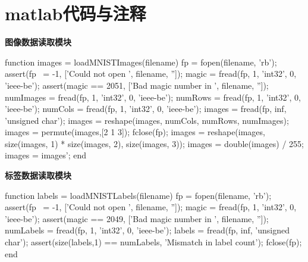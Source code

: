\newpage
\appendix
\section{matlab代码与注释}

\textcolor[rgb]{0.98,0.00,0.00}{\textbf{图像数据读取模块}}
\begin{python}
function images = loadMNISTImages(filename)
fp = fopen(filename, 'rb');
assert(fp ~= -1, ['Could not open ', filename, '']);
magic = fread(fp, 1, 'int32', 0, 'ieee-be');
assert(magic == 2051, ['Bad magic number in ', filename, '']);
numImages = fread(fp, 1, 'int32', 0, 'ieee-be');
numRows = fread(fp, 1, 'int32', 0, 'ieee-be');
numCols = fread(fp, 1, 'int32', 0, 'ieee-be');
images = fread(fp, inf, 'unsigned char');
images = reshape(images, numCols, numRows, numImages);
images = permute(images,[2 1 3]);
fclose(fp);
images = reshape(images, size(images, 1) * size(images, 2), size(images, 3));
images = double(images) / 255;
images = images';
end
\end{python}

\textcolor[rgb]{0.98,0.00,0.00}{\textbf{标签数据读取模块}}
\begin{python}
function labels = loadMNISTLabels(filename)
fp = fopen(filename, 'rb');
assert(fp ~= -1, ['Could not open ', filename, '']);
magic = fread(fp, 1, 'int32', 0, 'ieee-be');
assert(magic == 2049, ['Bad magic number in ', filename, '']);
numLabels = fread(fp, 1, 'int32', 0, 'ieee-be');
labels = fread(fp, inf, 'unsigned char');
assert(size(labels,1) == numLabels, 'Mismatch in label count');
fclose(fp);
end
\end{python}

